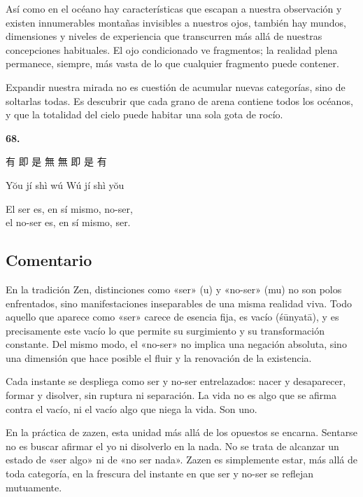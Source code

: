 \documentclass[
  a5paperpaper,
]{article}
\begin{document}
Así como en el océano hay características que escapan a nuestra
observación y existen innumerables montañas invisibles a nuestros ojos,
también hay mundos, dimensiones y niveles de experiencia que transcurren
más allá de nuestras concepciones habituales. El ojo condicionado ve
fragmentos; la realidad plena permanece, siempre, más vasta de lo que
cualquier fragmento puede contener.

Expandir nuestra mirada no es cuestión de acumular nuevas categorías,
sino de soltarlas todas. Es descubrir que cada grano de arena contiene
todos los océanos, y que la totalidad del cielo puede habitar una sola
gota de rocío.

\hfill\break

\hypertarget{03}{}
\begin{verseblock}

\newpage

\begin{center}\textbf{68.}\end{center}

有 即 是 無 無 即 是 有

Yŏu jí shì wú Wú jí shì yŏu

El ser es, en sí mismo, no-ser,\\
el no-ser es, en sí mismo, ser.

\end{verseblock}

\hfill\break

\hypertarget{comentario-67}{%
\subsection{Comentario}\label{comentario-67}}

En la tradición Zen, distinciones como «ser» (u) y «no-ser» (mu) no son
polos enfrentados, sino manifestaciones inseparables de una misma
realidad viva. Todo aquello que aparece como «ser» carece de esencia
fija, es vacío (śūnyatā), y es precisamente este vacío lo que permite su
surgimiento y su transformación constante. Del mismo modo, el «no-ser»
no implica una negación absoluta, sino una dimensión que hace posible el
fluir y la renovación de la existencia.

Cada instante se despliega como ser y no-ser entrelazados: nacer y
desaparecer, formar y disolver, sin ruptura ni separación. La vida no es
algo que se afirma contra el vacío, ni el vacío algo que niega la vida.
Son uno.

En la práctica de zazen, esta unidad más allá de los opuestos se
encarna. Sentarse no es buscar afirmar el yo ni disolverlo en la nada.
No se trata de alcanzar un estado de «ser algo» ni de «no ser nada».
Zazen es simplemente estar, más allá de toda categoría, en la frescura
del instante en que ser y no-ser se reflejan mutuamente.
\end{document}
